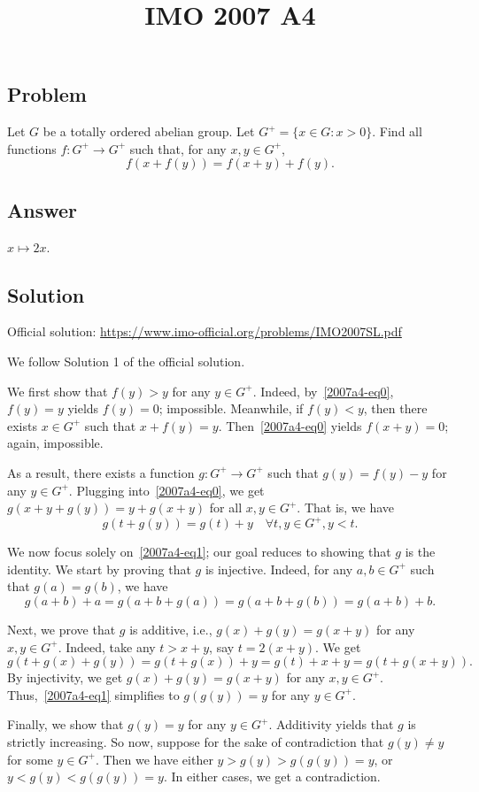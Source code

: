 \documentclass{article}
\title{IMO 2007 A4}
\author{}
\date{}
\begin{document}
\maketitle



\subsection*{Problem}

Let $G$ be a totally ordered abelian group.
Let $G^+ = \{x \in G : x > 0\}$.
Find all functions $f : G^+ \to G^+$ such that, for any $x, y \in G^+$,
\[ f(x + f(y)) = f(x + y) + f(y). \tag{*}\label{2007a4-eq0} \]



\subsection*{Answer}

$x \mapsto 2x$.



\subsection*{Solution}

Official solution: \url{https://www.imo-official.org/problems/IMO2007SL.pdf}

We follow Solution 1 of the official solution.

We first show that $f(y) > y$ for any $y \in G^+$.
Indeed, by~\eqref{2007a4-eq0}, $f(y) = y$ yields $f(y) = 0$; impossible.
Meanwhile, if $f(y) < y$, then there exists $x \in G^+$ such that $x + f(y) = y$.
Then~\eqref{2007a4-eq0} yields $f(x + y) = 0$; again, impossible.

As a result, there exists a function $g : G^+ \to G^+$ such that $g(y) = f(y) - y$ for any $y \in G^+$.
Plugging into~\eqref{2007a4-eq0}, we get $g(x + y + g(y)) = y + g(x + y)$ for all $x, y \in G^+$.
That is, we have
\[ g(t + g(y)) = g(t) + y \quad \forall t, y \in G^+, y < t. \tag{1}\label{2007a4-eq1} \]

We now focus solely on~\eqref{2007a4-eq1}; our goal reduces to showing that $g$ is the identity.
We start by proving that $g$ is injective.
Indeed, for any $a, b \in G^+$ such that $g(a) = g(b)$, we have
\[ g(a + b) + a = g(a + b + g(a)) = g(a + b + g(b)) = g(a + b) + b. \]

Next, we prove that $g$ is additive, i.e., $g(x) + g(y) = g(x + y)$ for any $x, y \in G^+$.
Indeed, take any $t > x + y$, say $t = 2(x + y)$.
We get
\[ g(t + g(x) + g(y)) = g(t + g(x)) + y = g(t) + x + y = g(t + g(x + y)). \]
By injectivity, we get $g(x) + g(y) = g(x + y)$ for any $x, y \in G^+$.
Thus,~\eqref{2007a4-eq1} simplifies to $g(g(y)) = y$ for any $y \in G^+$.

Finally, we show that $g(y) = y$ for any $y \in G^+$.
Additivity yields that $g$ is strictly increasing.
So now, suppose for the sake of contradiction that $g(y) \neq y$ for some $y \in G^+$.
Then we have either $y > g(y) > g(g(y)) = y$, or $y < g(y) < g(g(y)) = y$.
In either cases, we get a contradiction.
\end{document}
